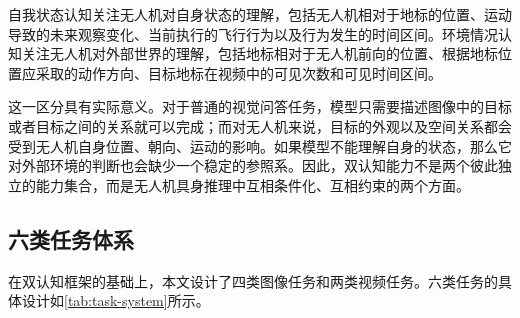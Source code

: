 自我状态认知关注无人机对自身状态的理解，包括无人机相对于地标的位置、运动导致的未来观察变化、当前执行的飞行行为以及行为发生的时间区间。环境情况认知关注无人机对外部世界的理解，包括地标相对于无人机前向的位置、根据地标位置应采取的动作方向、目标地标在视频中的可见次数和可见时间区间。

这一区分具有实际意义。对于普通的视觉问答任务，模型只需要描述图像中的目标或者目标之间的关系就可以完成；而对无人机来说，目标的外观以及空间关系都会受到无人机自身位置、朝向、运动的影响。如果模型不能理解自身的状态，那么它对外部环境的判断也会缺少一个稳定的参照系。因此，双认知能力不是两个彼此独立的能力集合，而是无人机具身推理中互相条件化、互相约束的两个方面。

\subsection{六类任务体系}

在双认知框架的基础上，本文设计了四类图像任务和两类视频任务。六类任务的具体设计如\autoref{tab:task-system}所示。

